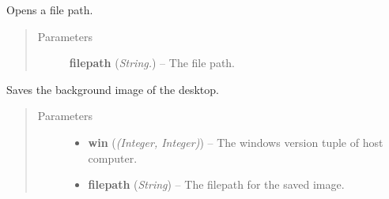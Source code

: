 \documentclass[letterpaper,10pt,english]{sphinxmanual}
\begin{document}

\begin{fulllineitems}
\label{api:filesystem.OpenFile}
Opens a file path.
\begin{quote}\begin{description}
\item[{Parameters}] \leavevmode
\textbf{filepath} (\emph{String.}) -- The file path.

\end{description}\end{quote}

\end{fulllineitems}


\begin{fulllineitems}
\label{api:filesystem.SaveScreen}
Saves the background image of the desktop.
\begin{quote}\begin{description}
\item[{Parameters}] \leavevmode\begin{itemize}
\item {} 
\textbf{win} (\emph{(Integer, Integer)}) -- The windows version tuple of host computer.

\item {} 
\textbf{filepath} (\emph{String}) -- The filepath for the saved image.

\end{itemize}

\end{description}\end{quote}

\end{fulllineitems}

\end{document}
